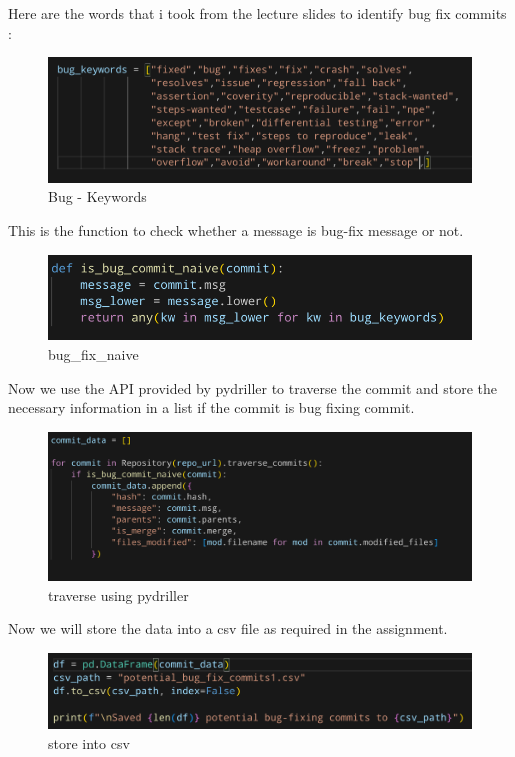 \documentclass[a4paper,12pt,twoside,english]{all-in-one} %
\begin{document}
Here are the words that i took from the lecture slides to identify bug fix commits :
\begin{figure}[H]
    \centering
    \includegraphics[width=0.75\linewidth]{image19.png}
    \caption{Bug - Keywords}
    \label{fig:placeholder}
\end{figure}

This is the function to check whether a message is bug-fix message or not.
\begin{figure}[H]
    \centering
    \includegraphics[width=0.75\linewidth]{image20.png}
    \caption{bug_fix_naive}
    \label{fig:placeholder}
\end{figure}

Now we use the API provided by pydriller to traverse the commit and store the necessary information in a list if the commit is bug fixing commit.
\begin{figure}[H]
    \centering
    \includegraphics[width=0.75\linewidth]{image21.png}
    \caption{traverse using pydriller}
    \label{fig:placeholder}
\end{figure}

Now we will store the data into a csv file as required in the assignment.
\begin{figure}[H]
    \centering
    \includegraphics[width=0.75\linewidth]{image.png}
    \caption{store into csv}
    \label{fig:placeholder}
\end{figure}
\end{document}
